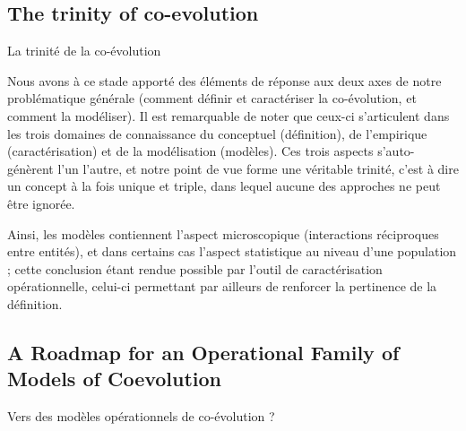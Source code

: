 \subsection*{The trinity of co-evolution}{La trinité de la co-évolution}


Nous avons à ce stade apporté des éléments de réponse aux deux axes de notre problématique générale (comment définir et caractériser la co-évolution, et comment la modéliser). Il est remarquable de noter que ceux-ci s'articulent dans les trois domaines de connaissance du conceptuel (définition), de l'empirique (caractérisation) et de la modélisation (modèles). Ces trois aspects s'auto-génèrent l'un l'autre, et notre point de vue forme une véritable trinité, c'est à dire un concept à la fois unique et triple, dans lequel aucune des approches ne peut être ignorée.

Ainsi, les modèles contiennent l'aspect microscopique (interactions réciproques entre entités), et dans certains cas l'aspect statistique au niveau d'une population ; cette conclusion étant rendue possible par l'outil de caractérisation opérationnelle, celui-ci permettant par ailleurs de renforcer la pertinence de la définition.



\subsection*{A Roadmap for an Operational Family of Models of Coevolution}{Vers des modèles opérationnels de co-évolution ?}




